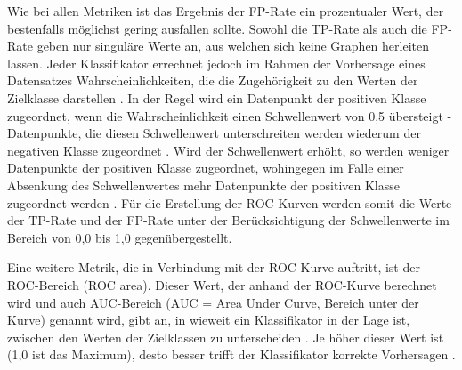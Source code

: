 Wie bei allen Metriken ist das Ergebnis der FP-Rate ein prozentualer Wert, der bestenfalls möglichst gering ausfallen sollte. Sowohl die TP-Rate als auch die FP-Rate geben nur singuläre Werte an, aus welchen sich keine Graphen herleiten lassen. Jeder Klassifikator errechnet jedoch im Rahmen der Vorhersage eines Datensatzes Wahrscheinlichkeiten, die die Zugehörigkeit zu den Werten der Zielklasse darstellen \cite{KNIMETV2019}. In der Regel wird ein Datenpunkt der positiven Klasse zugeordnet, wenn die Wahrscheinlichkeit einen Schwellenwert von 0,5 übersteigt - Datenpunkte, die diesen Schwellenwert unterschreiten werden wiederum der negativen Klasse zugeordnet \cite{KNIMETV2019}. Wird der Schwellenwert erhöht, so werden weniger Datenpunkte der positiven Klasse zugeordnet, wohingegen im Falle einer Absenkung des Schwellenwertes mehr Datenpunkte der positiven Klasse zugeordnet werden \cite{KNIMETV2019}. Für die Erstellung der ROC-Kurven werden somit die Werte der TP-Rate und der FP-Rate unter der Berücksichtigung der Schwellenwerte im Bereich von 0,0 bis 1,0 gegenübergestellt.

Eine weitere Metrik, die in Verbindung mit der ROC-Kurve auftritt, ist der ROC-Bereich (ROC area). Dieser Wert, der anhand der ROC-Kurve berechnet wird und auch AUC-Bereich (AUC = Area Under Curve, Bereich unter der Kurve) genannt wird, gibt an, in wieweit ein Klassifikator in der Lage ist, zwischen den Werten der Zielklassen zu unterscheiden \cite{Narkhede2018}. Je höher dieser Wert ist (1,0 ist das Maximum), desto besser trifft der Klassifikator korrekte Vorhersagen \cite{Narkhede2018}.

